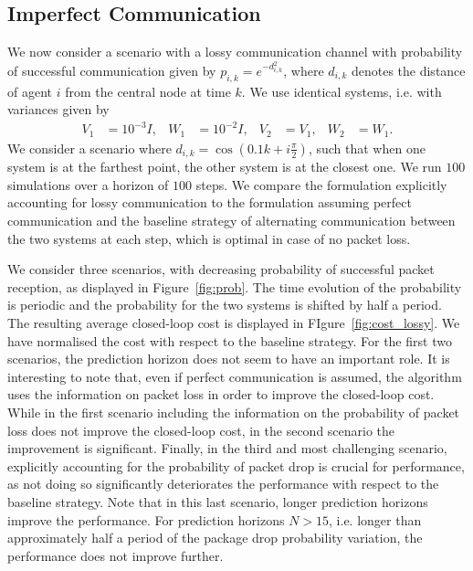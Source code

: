 \documentclass[letterpaper, 10 pt, conference]{ieeeconf}  %
\newcommand {\matr}[2]{\left[\begin{array}{#1}#2\end{array}\right]}
\begin{document}
\subsection{Imperfect Communication}

We now consider a scenario with a lossy communication channel with probability of successful communication given by $p_{i,k} = e^{-d_{i,k}^2}$, where $d_{i,k}$ denotes the distance of agent $i$ from the central node at time $k$. We use identical systems, i.e. with variances given by
\begin{align*}
V_1 &= 10^{-3}I%
, & W_1 &= 10^{-2}I%
, &
V_2 &= V_1, &	W_2 &= W_1.
\end{align*}
We consider a scenario where $d_{i,k} = \cos \left ( 0.1 k + i \frac{\pi}{2} \right )$, such that when one system is at the farthest point, the other system is at the closest one. We run $100$ simulations over a horizon of $100$ steps. 
We compare the formulation explicitly accounting for lossy communication to the formulation assuming perfect communication and the baseline strategy of alternating communication between the two systems at each step, which is optimal in case of no packet loss.

We consider three scenarios, with decreasing probability of successful packet reception, as displayed in Figure~\ref{fig:prob}. The time evolution of the probability is periodic and the probability for the two systems is shifted by half a period. The resulting average closed-loop cost is displayed in FIgure~\ref{fig:cost_lossy}. We have normalised the cost with respect to the baseline strategy. For the first two scenarios, the prediction horizon does not seem to have an important role. It is interesting to note that, even if perfect communication is assumed, the algorithm uses the information on packet loss in order to improve the closed-loop cost. While in the first scenario including the information on the probability of packet loss does not improve the closed-loop cost, in the second scenario the improvement is significant. Finally, in the third and most challenging scenario, explicitly accounting for the probability of packet drop is crucial for performance, as not doing so significantly deteriorates the performance with respect to the baseline strategy. Note that in this last scenario, longer prediction horizons improve the performance. For prediction horizons $N>15$, i.e. longer than approximately half a period of the package drop probability variation, the performance does not improve further.
\end{document}
